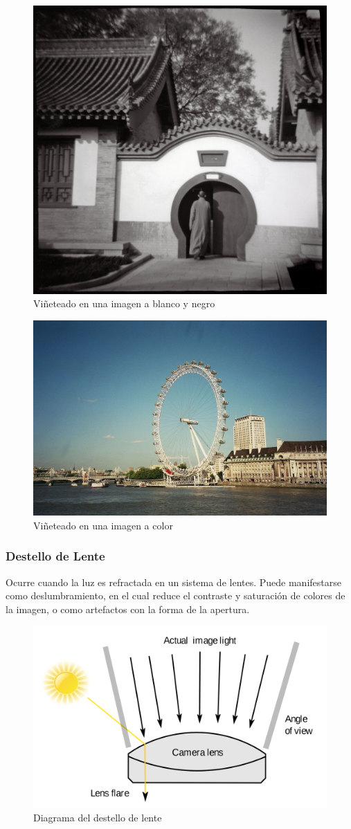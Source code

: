 \documentclass{article}
\begin{document}
\begin{figure}[H]
	\centering
	\includegraphics[width=0.55\linewidth]{Figuras/Vignetting_Real}
	\caption{Viñeteado en una imagen a blanco y negro}
	\label{fig:vignettingreal}
\end{figure}

\begin{figure}[H]
	\centering
	\includegraphics[width=0.65\linewidth]{Figuras/Vignetting_Real2}
	\caption{Viñeteado en una imagen a color}
	\label{fig:vignettingreal2}
\end{figure}

\subsubsection{Destello de Lente}

Ocurre cuando la luz es refractada en un sistema de lentes. Puede manifestarse como deslumbramiento, en el cual reduce el contraste y saturación de colores de la imagen, o como artefactos con la forma de la apertura.

\begin{figure}[H]
	\centering
	\includegraphics[width=0.65\linewidth]{Figuras/Flare}
	\caption{Diagrama del destello de lente}
	\label{fig:flare}
\end{figure}
\end{document}

